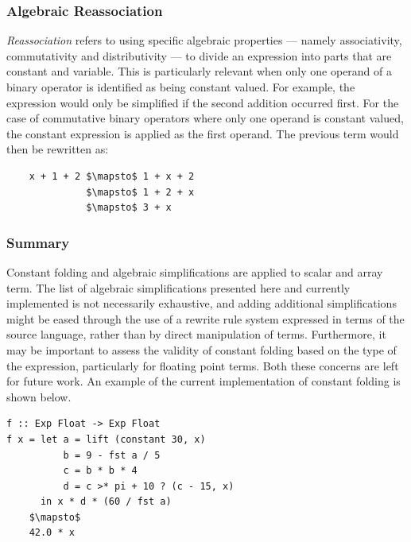 \subsubsection{Algebraic Reassociation}

\emph{Reassociation} refers to using specific algebraic properties --- namely
associativity, commutativity and distributivity --- to divide an expression into
parts that are constant and variable.
This is particularly relevant when only one operand of a binary
operator is identified as being constant valued. For example, the expression
 would only be simplified if the second addition occurred
first. For the case of commutative binary operators where only one operand is
constant valued, the constant expression is applied as the first operand. The
previous term would then be rewritten as:
%
\begin{lstlisting}[style=Haskell,numbers=none,mathescape]
%\bf$\langle$ algebraic reassociation $\rangle$%
    x + 1 + 2 $\mapsto$ 1 + x + 2
              $\mapsto$ 1 + 2 + x
              $\mapsto$ 3 + x
\end{lstlisting}


\subsubsection{Summary}

Constant folding and algebraic simplifications are applied to scalar and array
term. The list of algebraic simplifications presented here and currently
implemented is not necessarily exhaustive, and adding additional simplifications
might be eased through the use of a rewrite rule system expressed in terms of
the source language, rather than by direct manipulation of 
terms. Furthermore, it may be important to assess the validity of constant
folding based on the type of the expression, particularly for floating point
terms. Both these concerns are left for future work. An example of the current
implementation of constant folding is shown below.

\begin{lstlisting}[style=Haskell,mathescape,caption={Example of constant expression evaluation}]
f :: Exp Float -> Exp Float
f x = let a = lift (constant 30, x)
          b = 9 - fst a / 5
          c = b * b * 4
          d = c >* pi + 10 ? (c - 15, x)
      in x * d * (60 / fst a)
    $\mapsto$
    42.0 * x
\end{lstlisting}


